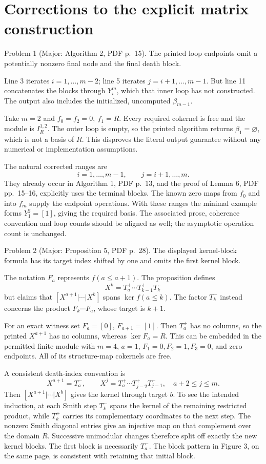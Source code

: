\documentclass[10pt]{article}
\begin{document}
\section*{Corrections to the explicit matrix construction}
Problem 1 (Major: Algorithm 2, PDF p. 15).  The printed loop endpoints omit a potentially nonzero final node and the final death block.\par
Line 3 iterates \(i=1,\ldots,m-2\); line 5 iterates \(j=i+1,\ldots,m-1\). But line 11 concatenates the blocks through \(Y_i^m\), which that inner loop has not constructed. The output also includes the initialized, uncomputed \(\beta_{m-1}\).\par
Take \(m=2\) and \(f_0=f_2=0,\ f_1=R\). Every required cokernel is free and the module is \(I_R^{1,2}\). The outer loop is empty, so the printed algorithm returns \(\beta_1=\varnothing\), which is not a basis of \(R\). This disproves the literal output guarantee without any numerical or implementation assumptions.\par
The natural corrected ranges are \[i=1,\ldots,m-1,\qquad j=i+1,\ldots,m .\] They already occur in Algorithm 1, PDF p. 13, and the proof of Lemma 6, PDF pp. 15–16, explicitly uses the terminal blocks. The known zero maps from \(f_0\) and into \(f_m\) supply the endpoint operations. With these ranges the minimal example forms \(Y_1^2=[1]\), giving the required basis. The associated prose, coherence convention and loop counts should be aligned as well; the asymptotic operation count is unchanged.\par
Problem 2 (Major: Proposition 5, PDF p. 28).  The displayed kernel-block formula has its target index shifted by one and omits the first kernel block.\par
The notation \(F_a\) represents \(f(a\le a+1)\). The proposition defines \[X^k=T_a^+\cdots T_{k-1}^+T_k^-\] but claims that \([X^{a+1}|\cdots|X^k]\) spans \(\ker f(a\le k)\). The factor \(T_k^-\) instead concerns the product \(F_k\cdots F_a\), whose target is \(k+1\).\par
For an exact witness set \(F_a=[0]\), \(F_{a+1}=[1]\). Then \(T_a^+\) has no columns, so the printed \(X^{a+1}\) has no columns, whereas \(\ker F_a=R\). This can be embedded in the permitted finite module with \(m=4\), \(a=1\), \(F_1=0,F_2=1,F_3=0\), and zero endpoints. All of its structure-map cokernels are free.\par
A consistent death-index convention is \[X^{a+1}=T_a^-,\qquad
 X^j=T_a^+\cdots T_{j-2}^+T_{j-1}^-,
 \quad a+2\le j\le m .\] Then \([X^{a+1}|\cdots|X^b]\) gives the kernel through target \(b\). To see the intended induction, at each Smith step \(T_k^-\) spans the kernel of the remaining restricted product, while \(T_k^+\) carries its complementary coordinates to the next step. The nonzero Smith diagonal entries give an injective map on that complement over the domain \(R\). Successive unimodular changes therefore split off exactly the new kernel blocks. The first block is necessarily \(T_a^-\). The block pattern in Figure 3, on the same page, is consistent with retaining that initial block.\par
\end{document}
